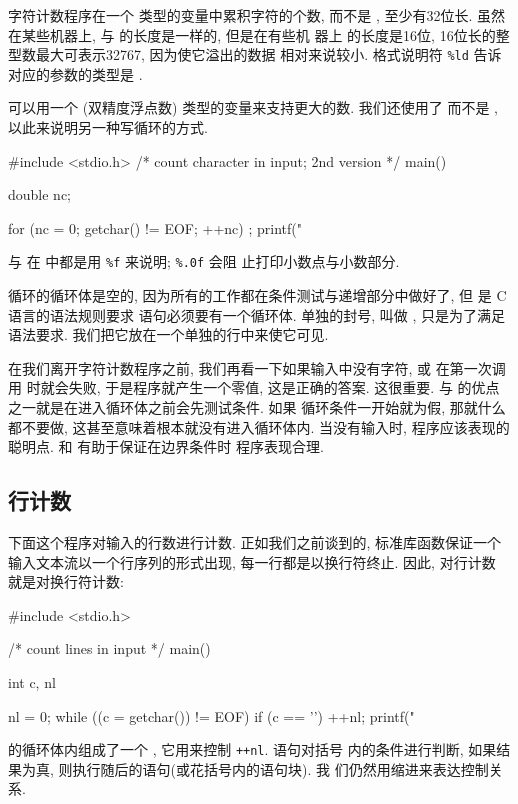 字符计数程序在一个 \clong 类型的变量中累积字符的个数, 而不是 \cint, \clong 
至少有32位长. 虽然在某些机器上, \cint 与 \clong 的长度是一样的, 但是在有些机
器上 \cint 的长度是16位, 16位长的整型数最大可表示32767, 因为使它溢出的数据
相对来说较小. 格式说明符 \verb"%ld" 告诉 \printf 对应的参数的类型是 \clong.

可以用一个 \cdouble(双精度浮点数) 类型的变量来支持更大的数. 我们还使用了
\cfor 而不是 \cwhile, 以此来说明另一种写循环的方式.
\begin{myverbatim}
    #include <stdio.h>
    /* count character in input; 2nd version */
    main()
    {
        double nc;

        for (nc = 0; getchar() != EOF; ++nc)
            ;
        printf("%
    }
\end{myverbatim}
\cfloat 与 \cdouble 在 \printf 中都是用 \verb"%f" 来说明; \verb"%.0f" 会阻
止打印小数点与小数部分.

\cfor 循环的循环体是空的, 因为所有的工作都在条件测试与递增部分中做好了, 但
是 C 语言的语法规则要求 \cfor 语句必须要有一个循环体. 单独的封号, 叫做%
, 只是为了满足语法要求. 我们把它放在一个单独的行中来使它可见.

在我们离开字符计数程序之前, 我们再看一下如果输入中没有字符, \cwhile 或 \cfor
在第一次调用 \cgetchar 时就会失败, 于是程序就产生一个零值, 这是正确的答案.
这很重要. \cwhile 与 \cfor 的优点之一就是在进入循环体之前会先测试条件. 如果 
循环条件一开始就为假, 那就什么都不要做, 这甚至意味着根本就没有进入循环体内.
当没有输入时, 程序应该表现的聪明点. \cwhile 和 \cfor 有助于保证在边界条件时
程序表现合理.

\subsection{行计数}
下面这个程序对输入的行数进行计数. 正如我们之前谈到的, 标准库函数保证一个
输入文本流以一个行序列的形式出现, 每一行都是以换行符终止. 因此, 对行计数
就是对换行符计数:
\begin{myverbatim}
    #include <stdio.h>

    /* count lines in input */
    main()
    {
        int c, nl

        nl = 0;
        while ((c = getchar()) != EOF)
            if (c == '\n')
                ++nl;
        printf("%
    }
\end{myverbatim}
\cwhile 的循环体内组成了一个 \cif, 它用来控制 \verb"++nl". \cif 语句对括号
内的条件进行判断, 如果结果为真, 则执行随后的语句(或花括号内的语句块). 我
们仍然用缩进来表达控制关系.

